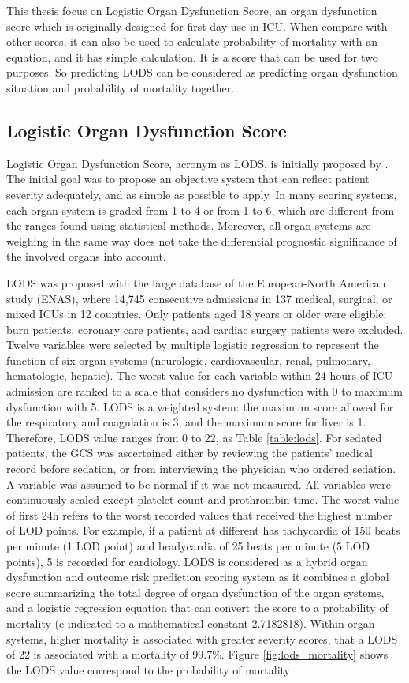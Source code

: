 \documentclass[12pt,a4paper,english
]{tunithesis}
\begin{document}
This thesis focus on Logistic Organ Dysfunction Score, an organ dysfunction score which is originally designed for first-day use in ICU. When compare with other scores, it can also be used to calculate probability of mortality with an equation, and it has simple calculation. It is a score that can be used for two purposes. So predicting LODS can be considered as predicting organ dysfunction situation and probability of mortality together. 

\subsection{Logistic Organ Dysfunction Score}
Logistic Organ Dysfunction Score, acronym as LODS, is initially proposed by \textcite{legall96}. The initial goal was to propose an objective system that can reflect  patient severity adequately, and as simple as possible to apply.  In many scoring systems, each organ system is graded from 1 to 4 or from 1 to 6, which are different from the ranges found using statistical methods. Moreover, all organ systems are weighing in the same way does not take the differential prognostic significance of the involved organs into account. 

LODS was proposed with the large database of the European-North American study (ENAS), where 14,745 consecutive admissions in 137 medical, surgical, or mixed ICUs in 12 countries. Only patients aged 18 years or older were eligible; burn patients, coronary care patients, and cardiac surgery patients were excluded. Twelve variables were selected by multiple logistic regression to represent the function of six organ systems (neurologic, cardiovascular, renal, pulmonary, hematologic, hepatic). The worst value for each variable within 24 hours of ICU admission are ranked to a scale that considers no dysfunction with 0 to maximum dysfunction with 5. LODS is a weighted system: the maximum score allowed for the respiratory and coagulation is 3, and the maximum score for liver is 1. Therefore, LODS value ranges from 0 to 22, as Table \ref{table:lods}. For sedated patients, the GCS was ascertained either by reviewing the patients' medical record before sedation, or from interviewing the physician who ordered sedation. A variable was assumed to be normal if it was not measured. All variables were continuously scaled except platelet count and prothrombin time. The worst value of first 24h refers to the worst recorded values that received the highest number of LOD points. For example, if a patient at different has tachycardia of 150 beats per minute (1 LOD point) and bradycardia of 25 beats per minute (5 LOD points), 5 is recorded for cardiology. LODS is considered as a hybrid organ dysfunction and outcome risk prediction scoring system as it combines a global score summarizing the total degree of organ dysfunction of the organ systems, and a logistic regression equation that can convert the score to a probability of mortality (e indicated to a mathematical constant 2.7182818). Within organ systems, higher mortality is associated with greater severity scores, that a LODS of 22 is associated with a mortality of 99.7\%. \parencite{Tiffany21, Vincent2010, sekulic2015} Figure \ref{fig:lods_mortality} shows the LODS value correspond to the probability of mortality
\end{document}
